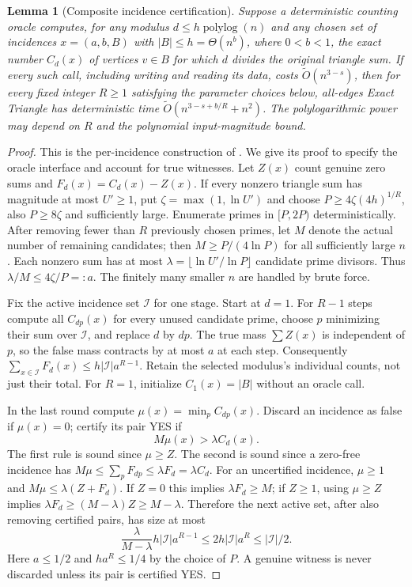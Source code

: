 \documentclass[11pt]{article}
\newtheorem{lemma}[theorem]{Lemma}
\newcommand{\softO}{\widetilde O}
\begin{document}
\begin{lemma}[Composite incidence certification]
\label{lem:composite-incidence}
Suppose a deterministic counting oracle computes, for any modulus
$d\le h\operatorname{polylog}(n)$ and any chosen set of incidences
$x=(a,b,B)$ with $|B|\le h=\Theta(n^b)$, where $0<b<1$, the exact number $C_d(x)$ of
vertices $v\in B$ for which $d$ divides the original triangle sum.
If every such call, including writing and reading its data, costs
$\softO(n^{3-s})$, then for every fixed integer $R\ge1$ satisfying the
parameter choices below, all-edges Exact Triangle has deterministic time
$\softO(n^{3-s+b/R}+n^2)$. The polylogarithmic power may depend on $R$
and the polynomial input-magnitude bound.
\end{lemma}
\begin{proof}
This is the per-incidence construction of \cite[Section 15.4]{M26}.
We give its proof to specify the oracle interface and account for true
witnesses. Let $Z(x)$ count genuine zero sums and $F_d(x)=C_d(x)-Z(x)$.
If every nonzero triangle sum has magnitude at most $U'\ge1$, put
$\zeta=\max(1,\ln U')$ and choose
$P\ge4\zeta(4h)^{1/R}$, also $P\ge8\zeta$ and sufficiently large.
Enumerate primes in $[P,2P)$ deterministically. After removing fewer than
$R$ previously chosen primes, let $M$ denote the actual number of remaining candidates; then
$M\ge P/(4\ln P)$ for all sufficiently large $n$.
Each nonzero sum has at most $\lambda=\lfloor\ln U'/\ln P\rfloor$
candidate prime divisors. Thus $\lambda/M\le4\zeta/P=:a$.
The finitely many smaller $n$ are handled by brute force.

Fix the active incidence set $\mathcal I$ for one stage. Start at $d=1$.
For $R-1$ steps compute all $C_{dp}(x)$ for every unused candidate prime,
choose $p$ minimizing their sum over $\mathcal I$, and replace $d$ by $dp$.
The true mass $\sum Z(x)$ is independent of $p$, so the false mass
contracts by at most $a$ at each step. Consequently
$\sum_{x\in\mathcal I}F_d(x)\le h|\mathcal I|a^{R-1}$.
Retain the selected modulus's individual counts, not just their total.
For $R=1$, initialize $C_1(x)=|B|$ without an oracle call.

In the last round compute $\mu(x)=\min_p C_{dp}(x)$. Discard an incidence
as false if $\mu(x)=0$; certify its pair YES if
\[
M\mu(x)>\lambda C_d(x).
\]
The first rule is sound since $\mu\ge Z$. The second is sound since a
zero-free incidence has
$M\mu\le\sum_pF_{dp}\le\lambda F_d=\lambda C_d$.
For an uncertified incidence, $\mu\ge1$ and
$M\mu\le\lambda(Z+F_d)$. If $Z=0$ this implies
$\lambda F_d\ge M$; if $Z\ge1$, using $\mu\ge Z$ implies
$\lambda F_d\ge(M-\lambda)Z\ge M-\lambda$.
Therefore the next active set, after also removing certified pairs, has
size at most
\[
\frac{\lambda}{M-\lambda}h|\mathcal I|a^{R-1}
\le 2h|\mathcal I|a^R\le |\mathcal I|/2.
\]
Here $a\le1/2$ and $h a^R\le1/4$ by the choice of $P$.
A genuine witness is never discarded unless its pair is certified YES.


\end{proof}
\end{document}
